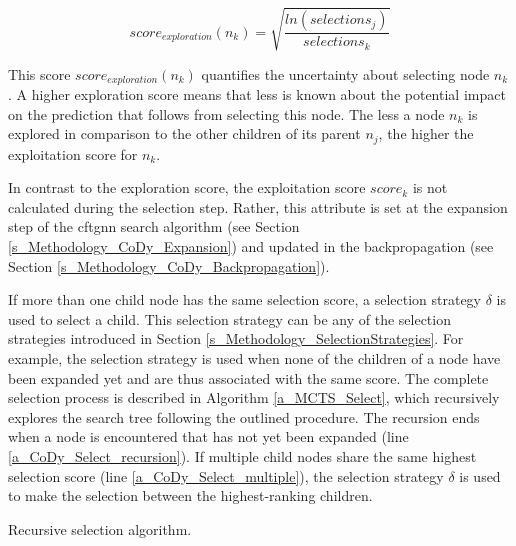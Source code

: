 \begin{equation}
    score_{exploration}(n_k) = \sqrt{\frac{ln(selections_j)}{selections_k}}
\end{equation}

This score $score_{exploration}(n_k)$ quantifies the uncertainty about selecting node $n_k$ \cite{auer_finite-time_2002, browne_survey_2012}. A higher exploration score means that less is known about the potential impact on the prediction that follows from selecting this node. The less a node $n_k$ is explored in comparison to the other children of its parent $n_j$, the higher the exploitation score for $n_k$.

In contrast to the exploration score, the exploitation score $score_k$ is not calculated during the selection step. Rather, this attribute is set at the expansion step of the \gls{cftgnn} search algorithm (see Section \ref{s_Methodology_CoDy_Expansion}) and updated in the backpropagation (see Section \ref{s_Methodology_CoDy_Backpropagation}).

If more than one child node has the same selection score, a selection strategy $\delta$ is used to select a child. This selection strategy can be any of the selection strategies introduced in Section \ref{s_Methodology_SelectionStrategies}. For example, the selection strategy is used when none of the children of a node have been expanded yet and are thus associated with the same score. The complete selection process is described in Algorithm \ref{a_MCTS_Select}, which recursively explores the search tree following the outlined procedure. The recursion ends when a node is encountered that has not yet been expanded (line \ref{a_CoDy_Select_recursion}). If multiple child nodes share the same highest selection score (line \ref{a_CoDy_Select_multiple}), the selection strategy $\delta$ is used to make the selection between the highest-ranking children.

{
\setlength{\algomargin}{1.25em}
\small
\begin{algorithm}[ht]
\caption{Recursive selection algorithm.}
\label{a_MCTS_Select}
\end{algorithm}
}


